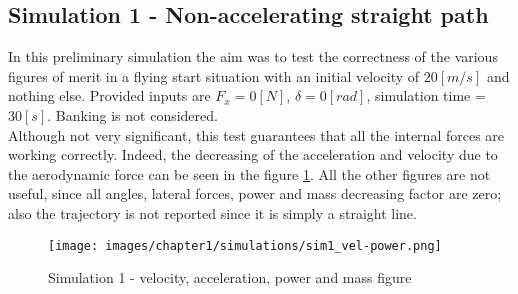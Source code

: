 \documentclass{report}
\let\Oldsubsection\subsection
\renewcommand{\subsection}{\FloatBarrier\Oldsubsection}
\begin{document}
\subsection{Simulation 1 - Non-accelerating straight path}
In this preliminary simulation the aim was to test the correctness of the various figures of merit in a flying start situation with an initial velocity of $20[m/s]$ and nothing else. Provided inputs are $F_x = 0 [N]$, $\delta = 0 [rad]$, simulation time = $30 [s]$. Banking is not considered. 
\\Although not very significant, this test guarantees that all the internal forces are working correctly. Indeed, the decreasing of the acceleration and velocity due to the aerodynamic force can be seen in the figure \ref{fig:sim1_1}. All the other figures are not useful, since all angles, lateral forces, power and mass decreasing factor are zero; also the trajectory is not reported since it is simply a straight line. \\

\begin{figure}[h!]
    \centering
    \texttt{[image: images/chapter1/simulations/sim1\_vel-power.png]}
    \caption{Simulation 1 - velocity, acceleration, power and mass figure}
    \label{fig:sim1_1}
\end{figure}
\end{document}

